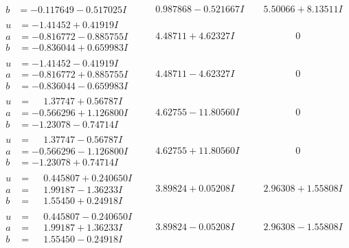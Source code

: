 \documentclass[1p]{elsarticle_modified}
\theoremstyle{definition}
\begin{document}
$$\begin{array}{c|c|c}
\begin{aligned}
b &= -0.117649 - 0.517025 I\end{aligned}
 & \phantom{-}0.987868 - 0.521667 I & \phantom{-}5.50066 + 8.13511 I \\ \hline\begin{aligned}
u &= -1.41452 + 0.41919 I \\
a &= -0.816772 - 0.885755 I \\
b &= -0.836044 + 0.659983 I\end{aligned}
 & \phantom{-}4.48711 + 4.62327 I & \phantom{-0.000000 } 0 \\ \hline\begin{aligned}
u &= -1.41452 - 0.41919 I \\
a &= -0.816772 + 0.885755 I \\
b &= -0.836044 - 0.659983 I\end{aligned}
 & \phantom{-}4.48711 - 4.62327 I & \phantom{-0.000000 } 0 \\ \hline\begin{aligned}
u &= \phantom{-}1.37747 + 0.56787 I \\
a &= -0.566296 + 1.126800 I \\
b &= -1.23078 - 0.74714 I\end{aligned}
 & \phantom{-}4.62755 - 11.80560 I & \phantom{-0.000000 } 0 \\ \hline\begin{aligned}
u &= \phantom{-}1.37747 - 0.56787 I \\
a &= -0.566296 - 1.126800 I \\
b &= -1.23078 + 0.74714 I\end{aligned}
 & \phantom{-}4.62755 + 11.80560 I & \phantom{-0.000000 } 0 \\ \hline\begin{aligned}
u &= \phantom{-}0.445807 + 0.240650 I \\
a &= \phantom{-}1.99187 - 1.36233 I \\
b &= \phantom{-}1.55450 + 0.24918 I\end{aligned}
 & \phantom{-}3.89824 + 0.05208 I & \phantom{-}2.96308 + 1.55808 I \\ \hline\begin{aligned}
u &= \phantom{-}0.445807 - 0.240650 I \\
a &= \phantom{-}1.99187 + 1.36233 I \\
b &= \phantom{-}1.55450 - 0.24918 I\end{aligned}
 & \phantom{-}3.89824 - 0.05208 I & \phantom{-}2.96308 - 1.55808 I \\ \hline\begin{aligned}

\end{aligned}
\end{array}$$
\end{document}
